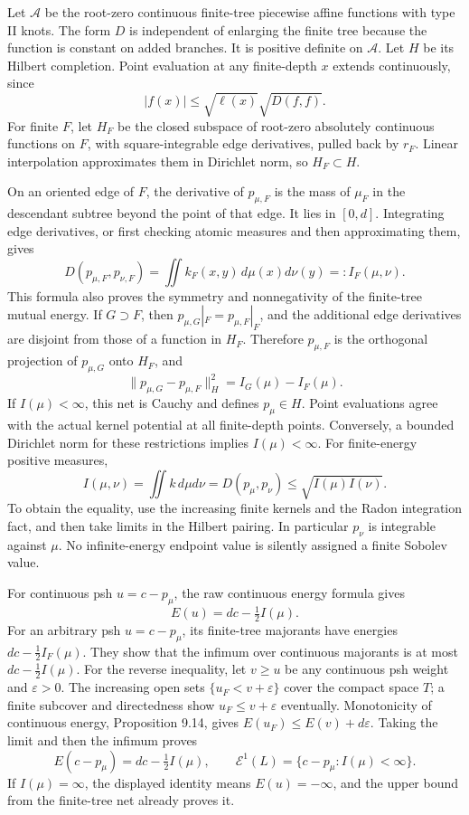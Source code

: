 \documentclass[
  11pt,
]{article}
\begin{document}
Let \(\mathcal A\) be the root-zero continuous finite-tree piecewise
affine functions with type II knots. The form \(D\) is independent of
enlarging the finite tree because the function is constant on added
branches. It is positive definite on \(\mathcal A\). Let \(H\) be its
Hilbert completion. Point evaluation at any finite-depth \(x\) extends
continuously, since \[
|f(x)|\leq\sqrt{\ell(x)}\sqrt{D(f,f)}.
\] For finite \(F\), let \(H_F\) be the closed subspace of root-zero
absolutely continuous functions on \(F\), with square-integrable edge
derivatives, pulled back by \(r_F\). Linear interpolation approximates
them in Dirichlet norm, so \(H_F\subset H\).

On an oriented edge of \(F\), the derivative of \(p_{\mu,F}\) is the
mass of \(\mu_F\) in the descendant subtree beyond the point of that
edge. It lies in \([0,d]\). Integrating edge derivatives, or first
checking atomic measures and then approximating them, gives \[
D(p_{\mu,F},p_{\nu,F})=\iint k_F(x,y)\,d\mu(x)d\nu(y)=:I_F(\mu,\nu).
\] This formula also proves the symmetry and nonnegativity of the
finite-tree mutual energy. If \(G\supset F\), then
\(p_{\mu,G}|_F=p_{\mu,F}|_F\), and the additional edge derivatives are
disjoint from those of a function in \(H_F\). Therefore \(p_{\mu,F}\) is
the orthogonal projection of \(p_{\mu,G}\) onto \(H_F\), and \[
\|p_{\mu,G}-p_{\mu,F}\|_H^2=I_G(\mu)-I_F(\mu).
\] If \(I(\mu)<\infty\), this net is Cauchy and defines \(p_\mu\in H\).
Point evaluations agree with the actual kernel potential at all
finite-depth points. Conversely, a bounded Dirichlet norm for these
restrictions implies \(I(\mu)<\infty\). For finite-energy positive
measures, \[
I(\mu,\nu)=\iint k\,d\mu d\nu
=D(p_\mu,p_\nu)\leq\sqrt{I(\mu)I(\nu)}.
\] To obtain the equality, use the increasing finite kernels and the
Radon integration fact, and then take limits in the Hilbert pairing. In
particular \(p_\nu\) is integrable against \(\mu\). No infinite-energy
endpoint value is silently assigned a finite Sobolev value.

For continuous psh \(u=c-p_\mu\), the raw continuous energy formula
gives \[
E(u)=dc-\tfrac12 I(\mu).
\] For an arbitrary psh \(u=c-p_\mu\), its finite-tree majorants have
energies \(dc-\tfrac12 I_F(\mu)\). They show that the infimum over
continuous majorants is at most \(dc-\tfrac12 I(\mu)\). For the reverse
inequality, let \(v\geq u\) be any continuous psh weight and
\(\varepsilon>0\). The increasing open sets \(\{u_F<v+\varepsilon\}\)
cover the compact space \(T\); a finite subcover and directedness show
\(u_F\leq v+\varepsilon\) eventually. Monotonicity of continuous energy,
Proposition 9.14, gives \(E(u_F)\leq E(v)+d\varepsilon\). Taking the
limit and then the infimum proves \[
E(c-p_\mu)=dc-\tfrac12 I(\mu),\qquad
\mathcal E^1(L)=\{c-p_\mu:I(\mu)<\infty\}.
\] If \(I(\mu)=\infty\), the displayed identity means \(E(u)=-\infty\),
and the upper bound from the finite-tree net already proves it.
\end{document}
